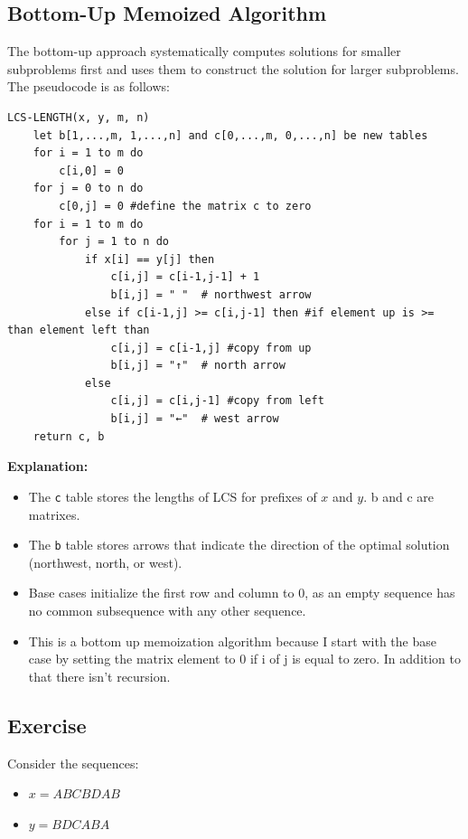 \subsection{Bottom-Up Memoized Algorithm}

The bottom-up approach systematically computes solutions for smaller subproblems first and uses them to construct the solution for larger subproblems. The pseudocode is as follows:

\begin{verbatim}
LCS-LENGTH(x, y, m, n)
    let b[1,...,m, 1,...,n] and c[0,...,m, 0,...,n] be new tables
    for i = 1 to m do
        c[i,0] = 0
    for j = 0 to n do
        c[0,j] = 0 #define the matrix c to zero
    for i = 1 to m do
        for j = 1 to n do
            if x[i] == y[j] then
                c[i,j] = c[i-1,j-1] + 1
                b[i,j] = " "  # northwest arrow
            else if c[i-1,j] >= c[i,j-1] then #if element up is >= than element left than
                c[i,j] = c[i-1,j] #copy from up
                b[i,j] = "↑"  # north arrow
            else
                c[i,j] = c[i,j-1] #copy from left
                b[i,j] = "←"  # west arrow
    return c, b
\end{verbatim}

\textbf{Explanation:}
\begin{itemize}
    \item The \texttt{c} table stores the lengths of LCS for prefixes of $x$ and $y$. b and c are matrixes.
    \item The \texttt{b} table stores arrows that indicate the direction of the optimal solution (northwest, north, or west).
    \item Base cases initialize the first row and column to 0, as an empty sequence has no common subsequence with any other sequence.
    \item This is a bottom up memoization algorithm because I start with the base case by setting the matrix element to 0 if i of j is equal to zero. In addition to that there isn't recursion.
\end{itemize}
\newpage
\subsection{Exercise}
Consider the sequences:
\begin{itemize}
    \item $x = A B C B D A B$
    \item $y = B D C A B A$
\end{itemize}

